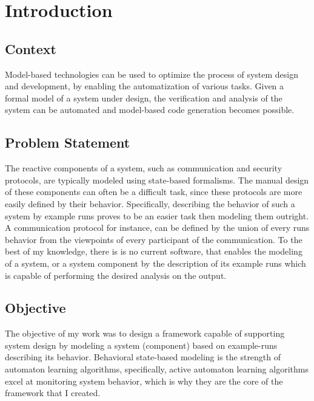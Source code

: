 \chapter{Introduction}

\section{Context}

Model-based technologies can be used to optimize the process of system design and development, by enabling the automatization of various tasks. Given a formal model of a system under design, the verification and analysis of the system can be automated and model-based code generation becomes possible.

\section{Problem Statement}

The reactive components of a system, such as communication and security protocols, are typically modeled using state-based formalisms. The manual design of these components can often be a difficult task, since these protocols are more easily defined by their behavior. Specifically, describing the behavior of such a system by example runs proves to be an easier task then modeling them outright. A communication protocol for instance, can be defined by the union of every runs behavior from the viewpoints of every participant of the communication. To the best of my knowledge, there is is no current software, that enables the modeling of a system, or a system component by the description of its example runs which is capable of performing the desired analysis on the output.

\section{Objective}

The objective of my work was to design a framework capable of supporting system design by modeling a system (component) based on example-runs describing its behavior. Behavioral state-based modeling is the strength of automaton learning algorithms, specifically, active automaton learning algorithms excel at monitoring system behavior, which is why they are the core of the framework that I created.

